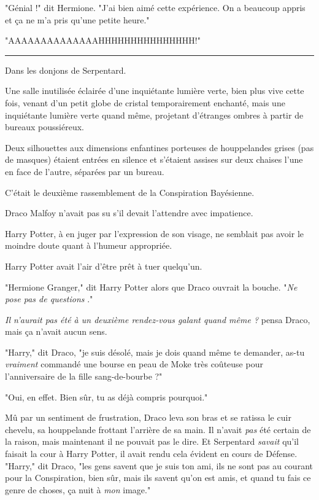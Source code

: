 "Génial !" dit Hermione. "J'ai bien aimé cette expérience. On a beaucoup appris et ça ne m'a pris qu'une petite heure."

"AAAAAAAAAAAAAAHHHHHHHHHHHHHHH!"
\par\noindent\rule{\textwidth}{0.4pt}
Dans les donjons de Serpentard.

Une salle inutilisée éclairée d'une inquiétante lumière verte, bien plus vive cette fois, venant d'un petit globe de cristal temporairement enchanté, mais une inquiétante lumière verte quand même, projetant d'étranges ombres à partir de bureaux poussiéreux.

Deux silhouettes aux dimensions enfantines porteuses de houppelandes grises (pas de masques) étaient entrées en silence et s'étaient assises sur deux chaises l'une en face de l'autre, séparées par un bureau.

C'était le deuxième rassemblement de la Conspiration Bayésienne.

Draco Malfoy n'avait pas su s'il devait l'attendre avec impatience.

Harry Potter, à en juger par l'expression de son visage, ne semblait pas avoir le moindre doute quant à l'humeur appropriée.

Harry Potter avait l'air d'être prêt à tuer quelqu'un.

"Hermione Granger," dit Harry Potter alors que Draco ouvrait la bouche. "\emph{Ne pose pas de questions} ."

\emph{Il n'aurait pas été à un deuxième rendez-vous galant quand même ?}  pensa Draco, mais ça n'avait aucun sens.

"Harry," dit Draco, "je suis désolé, mais je dois quand même te demander, as-tu \emph{vraiment}  commandé une bourse en peau de Moke très coûteuse pour l'anniversaire de la fille sang-de-bourbe ?"

"Oui, en effet. Bien sûr, tu as déjà compris pourquoi."

Mû par un sentiment de frustration, Draco leva son bras et se ratissa le cuir chevelu, sa houppelande frottant l'arrière de sa main. Il n'avait \emph{pas } été certain de la raison, mais maintenant il ne pouvait pas le dire. Et Serpentard \emph{savait}  qu'il faisait la cour à Harry Potter, il avait rendu cela évident en cours de Défense. "Harry," dit Draco, "les gens savent que je suis ton ami, ils ne sont pas au courant pour la Conspiration, bien sûr, mais ils savent qu'on est amis, et quand tu fais ce genre de choses, ça nuit à \emph{mon}  image."

